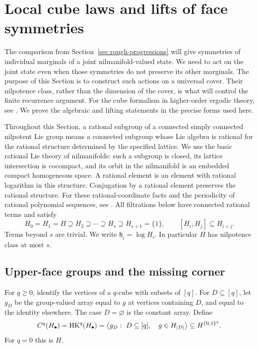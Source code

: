 \section{Local cube laws and lifts of face symmetries}
\label{sec:cube-limits}

The comparison from Section~\ref{sec:rough-progressions} will give symmetries
of individual marginals of a joint nilmanifold-valued state.  We need to act on
the joint state even when those symmetries do not preserve its other
marginals.  The purpose of this Section is to construct such actions on a
universal cover.  Their nilpotence class, rather than the dimension of the
cover, is what will control the finite recurrence argument.
For the cube formalism in higher-order ergodic theory, see \cite{HostKra}.
We prove the algebraic and lifting statements in the precise forms used here.

Throughout this Section, a rational subgroup of a connected simply connected
nilpotent Lie group means a connected subgroup whose Lie algebra is rational
for the rational structure determined by the specified lattice.  We use the
basic rational Lie theory of nilmanifolds: such a subgroup is closed, its
lattice intersection is cocompact, and its orbit in the nilmanifold is an
embedded compact homogeneous space.  A rational element is an element with
rational logarithm in this structure.  Conjugation by a rational element
preserves the rational structure.  For these rational-coordinate facts
and the periodicity of rational polynomial sequences, see
\cite[Section~2 and Appendix~A]{GreenTao}.
All filtrations below have connected
rational terms and satisfy
\begin{equation}
 H_0=H_1=H\supseteq H_2\supseteq\cdots\supseteq H_s
 \supseteq H_{s+1}=\{1\},\qquad
 [H_i,H_j]\subseteq H_{i+j}.
 \label{eq:cube-filtration}
\end{equation}
Terms beyond $s$ are trivial.  We write $\mathfrak h_i=\log H_i$.
In particular $H$ has nilpotence class at most $s$.

\subsection{Upper-face groups and the missing corner}

For $q\geq0$, identify the vertices of a $q$-cube with subsets of $[q]$.
For $D\subseteq[q]$, let $g_D$ be the group-valued array equal to $g$ at
vertices containing $D$, and equal to the identity elsewhere.  The case
$D=\varnothing$ is the constant array.  Define
\[
 C^q(H_\bullet)=\operatorname{HK}^q(H_\bullet)
 =\left\langle g_D:\ D\subseteq[q],\quad g\in H_{|D|}\right\rangle
 \subseteq H^{\{0,1\}^q}.
\]
For $q=0$ this is $H$.

